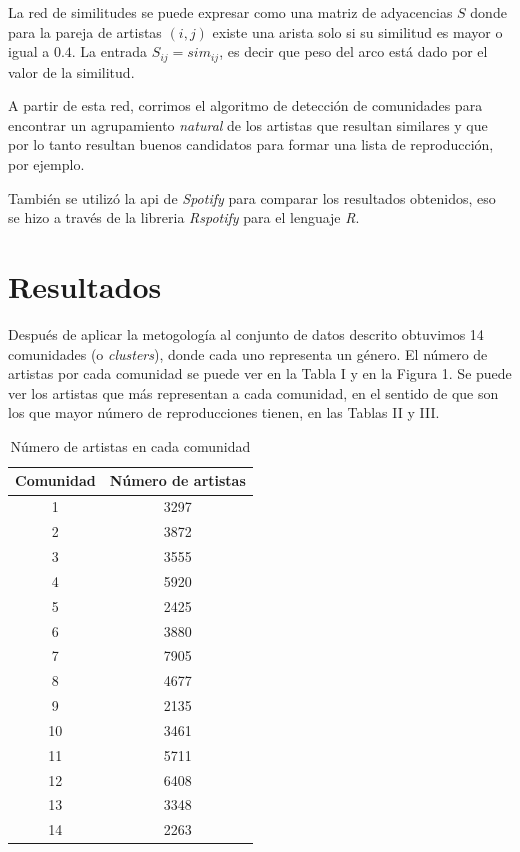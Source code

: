 \documentclass[conference]{IEEEtran}
\begin{document}
La red de similitudes se puede expresar como una matriz de adyacencias $S$ donde para la pareja de artistas $(i,j)$ existe una arista solo si su similitud es mayor o igual a $0.4$. La entrada $S_{ij} = sim_{ij}$, es decir que peso del arco está dado por el valor de la similitud. 

A partir de esta red, corrimos el algoritmo de detección de comunidades para encontrar un agrupamiento \textit{natural} de los artistas que resultan similares y que por lo tanto resultan buenos candidatos para formar una lista de reproducción, por ejemplo.

También se utilizó la api de \textit{Spotify} para comparar los resultados obtenidos, eso se hizo a través de la libreria \textit{Rspotify} para el lenguaje \textit{R}. 

\section{Resultados}

Después de aplicar la metogología al conjunto de datos descrito obtuvimos 14 comunidades (o \textit{clusters}), donde cada uno representa un género. El número de artistas por cada comunidad se puede ver en la Tabla I y en la Figura 1. Se puede ver los artistas que más representan a cada comunidad, en el sentido de que son los que mayor número de reproducciones tienen, en las Tablas II y III.

\begin{table}[ht]
\centering
\label{table:numero_artistas_comunidad}
\caption{Número de artistas en cada comunidad}
\begin{tabular}{|c|c|}
  \hline
 Comunidad & Número de artistas \\ 
  \hline
1 & 3297 \\ 
2 & 3872 \\ 
3 & 3555 \\ 
4 & 5920 \\ 
5 & 2425 \\ 
6 & 3880 \\ 
7 & 7905 \\ 
8 & 4677 \\ 
9 & 2135 \\ 
10 & 3461 \\ 
11 & 5711 \\ 
12 & 6408 \\ 
13 & 3348 \\ 
14 & 2263 \\ 
   \hline
\end{tabular}
\end{table}
\end{document}
